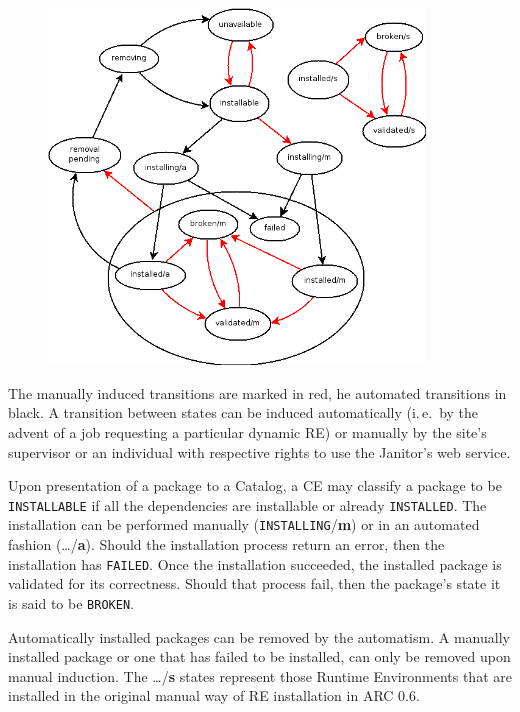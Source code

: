 \begin{figure}[!h]
  \begin{center}
    \includegraphics[width=10cm]{images/RE_states.png}
    \label{fig:RE_states}
  \end{center}
\end{figure}
 
The manually induced transitions are marked in red, he automated transitions in black.
A transition between states can be induced automatically (i.\,e.\ by the
advent of a job requesting a particular dynamic RE) or manually by the
site's supervisor or an individual with respective rights to use the
Janitor's web service.

Upon presentation of a package to a Catalog, a CE may
classify a package to be \texttt{INSTALLABLE} if all the dependencies
are installable or already \texttt{INSTALLED}. The installation can be
performed manually (\texttt{INSTALLING}/{\bf m}) or in an automated fashion
(\ldots/{\bf a}). Should the installation process return an error, then
the installation has \texttt{FAILED}. Once the installation succeeded,
the installed package is validated for its correctness. Should that
process fail, then the package's state it is said to be \texttt{BROKEN}.

Automatically installed packages can be removed by the automatism. A
manually installed package or one that has failed to be installed,
can only be removed upon manual induction.  The \ldots/{\bf s} states
represent those Runtime Environments that are installed in the original
manual way of RE installation in ARC 0.6.

